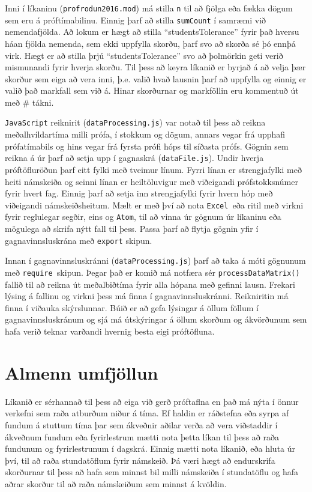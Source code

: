 \documentclass[12pt]{article}
\begin{document}
\medskip

Inni í líkaninu (\texttt{profrodun2016.mod}) má stilla \texttt{n} til að fjölga eða fækka dögum sem eru á próftímabilinu. Einnig þarf að stilla \texttt{sumCount} í samræmi við nemendafjölda. Að lokum er hægt að stilla “studentsTolerance” fyrir það hversu háan fjölda nemenda, sem ekki uppfylla skorðu, þarf svo að skorða sé þó ennþá virk. Hægt er að stilla þrjú “studentsTolerance” svo að þolmörkin geti verið mismunandi fyrir hverja skorðu. 
Til þess að keyra líkanið er byrjað á að velja þær skorður sem eiga að vera inni, þ.e. valið hvað lausnin þarf að uppfylla og einnig er valið það markfall sem við á. Hinar skorðurnar og markföllin eru kommentuð út með \# tákni. 

\medskip

\texttt{JavaScript} reiknirit (\texttt{dataProcessing.js}) var notað til þess að reikna meðalhvíldartíma milli prófa, í stokkum og dögum,  annars vegar frá upphafi prófatímabils og hins vegar frá fyrsta prófi hóps til síðasta prófs. Gögnin sem reikna á úr þarf að setja upp í gagnaskrá (\texttt{dataFile.js}). Undir hverja próftöfluröðun þarf eitt fylki með tveimur línum. Fyrri línan er strengjafylki með heiti námskeiða og seinni línan er heiltöluvigur með viðeigandi prófstokksnúmer fyrir hvert fag. Einnig þarf að setja inn strengjafylki fyrir hvern hóp með viðeigandi námskeiðsheitum. Mælt er með því að nota \texttt{Excel }eða ritil með virkni fyrir reglulegar segðir, eins og \texttt{Atom}, til að vinna úr gögnum úr líkaninu eða mögulega að skrifa nýtt fall til þess. Passa þarf að flytja gögnin yfir í gagnavinnsluskrána með \texttt{export} skipun.

\newpage
Innan í gagnavinnsluskránni (\texttt{dataProcessing.js}) þarf að taka á móti gögnunum með \texttt{require }skipun. Þegar það er komið má notfæra sér \texttt{processDataMatrix()} fallið til að reikna út meðalbiðtíma fyrir alla hópana með gefinni lausn. Frekari lýsing á fallinu og virkni þess má finna í gagnavinnsluskránni.
Reikniritin má finna í viðauka skýrslunnar. Búið er að gefa lýsingar á öllum föllum í gagnavinnsluskránum og sjá má útskýringar á öllum skorðum og ákvörðunum sem hafa verið teknar varðandi hvernig besta eigi próftöfluna.

\section{Almenn umfjöllun}

Líkanið er sérhannað til þess að eiga við gerð próftaflna en það má nýta í önnur verkefni sem raða atburðum niður á tíma. Ef haldin er ráðstefna eða syrpa af fundum á stuttum tíma þar sem ákveðnir aðilar verða að vera viðstaddir í ákveðnum fundum eða fyrirlestrum mætti nota þetta líkan til þess að raða fundunum og fyrirlestrunum í dagskrá. Einnig mætti nota líkanið, eða hluta úr því, til að raða stundatöflum fyrir námskeið. Þá væri hægt að endurskrifa skorðurnar til þess að hafa sem minnst bil milli námskeiða í stundatöflu og hafa aðrar skorður til að raða námskeiðum sem minnst á kvöldin.
\end{document}
